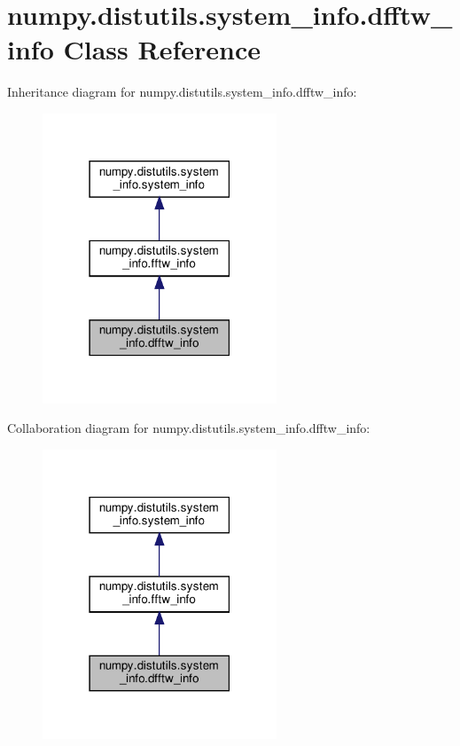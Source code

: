 \hypertarget{classnumpy_1_1distutils_1_1system__info_1_1dfftw__info}{}\section{numpy.\+distutils.\+system\+\_\+info.\+dfftw\+\_\+info Class Reference}
\label{classnumpy_1_1distutils_1_1system__info_1_1dfftw__info}


Inheritance diagram for numpy.\+distutils.\+system\+\_\+info.\+dfftw\+\_\+info\+:
\nopagebreak
\begin{figure}[H]
\begin{center}
\leavevmode
\includegraphics[width=198pt]{classnumpy_1_1distutils_1_1system__info_1_1dfftw__info__inherit__graph}
\end{center}
\end{figure}


Collaboration diagram for numpy.\+distutils.\+system\+\_\+info.\+dfftw\+\_\+info\+:
\nopagebreak
\begin{figure}[H]
\begin{center}
\leavevmode
\includegraphics[width=198pt]{classnumpy_1_1distutils_1_1system__info_1_1dfftw__info__coll__graph}
\end{center}
\end{figure}
